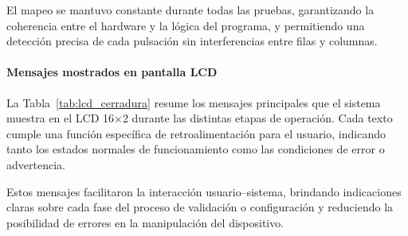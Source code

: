 El mapeo se mantuvo constante durante todas las pruebas, garantizando la coherencia entre el hardware y la lógica del programa, 
y permitiendo una detección precisa de cada pulsación sin interferencias entre filas y columnas.

\vspace{0.3cm}

\paragraph{Mensajes mostrados en pantalla LCD}

La Tabla~\ref{tab:lcd_cerradura} resume los mensajes principales que el sistema muestra en el LCD 16×2 durante las distintas etapas de operación.  
Cada texto cumple una función específica de retroalimentación para el usuario, 
indicando tanto los estados normales de funcionamiento como las condiciones de error o advertencia.

\begin{table}[H]
\centering
{}
\caption{Mensajes visualizados en la pantalla LCD durante la operación del sistema. Fuente: elaboración propia.}
\label{tab:lcd_cerradura}
\end{table}

Estos mensajes facilitaron la interacción usuario–sistema, 
brindando indicaciones claras sobre cada fase del proceso de validación o configuración 
y reduciendo la posibilidad de errores en la manipulación del dispositivo.

